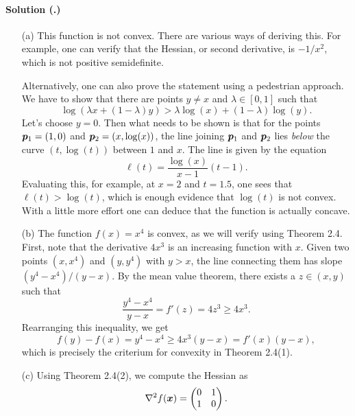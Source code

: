 \documentclass{article}
\newcounter{problemSheetNumber}
\newcounter{problems}
\renewcommand{\solution}[1]{\paragraph{Solution (\theproblemSheetNumber.\theproblems)}\addtocounter{problems}{1}\label{#1}}
\begin{document}
\solution{pr:2}
\begin{itemize}
 \item[(a)] This function is not convex. There are various ways of deriving this. For example, one can verify that the Hessian, or second derivative, is $-1/x^2$, which is not positive semidefinite. 
 
 Alternatively, one can also prove the statement using a pedestrian approach. We have to show that there are points $y\neq x$ and $\lambda \in [0,1]$ such that
 \begin{equation*}
  \log(\lambda x+(1-\lambda)y) > \lambda \log(x)+(1-\lambda)\log(y).
 \end{equation*}
 Let's choose $y=0$. Then what needs to be shown is that for the points $\bm{p}_1=(1,0)$ and $\bm{p}_2=(x,\log(x))$,
 the line joining $\bm{p}_1$ and $\bm{p}_2$ lies {\em below} the curve $(t,\log(t))$ between $1$ and $x$. The line is given by the equation
 \begin{equation*}
  \ell(t) = \frac{\log(x)}{x-1}(t-1).
 \end{equation*}
 Evaluating this, for example, at $x=2$ and $t=1.5$, one sees that $\ell(t)>\log(t)$, which is enough evidence that $\log(t)$ is not convex.
 With a little more effort one can deduce that the function is actually concave.
\item[(b)] The function $f(x)=x^4$ is convex, as we will verify using Theorem 2.4. First, note that the derivative $4x^3$ is an increasing function with $x$. 
Given two points $(x,x^4)$ and $(y,y^4)$ with $y>x$, the line connecting them has slope $(y^4-x^4)/(y-x)$. By the mean value theorem, there exists a $z\in (x,y)$ such that
\begin{equation*}
 \frac{y^4-x^4}{y-x} = f'(z) = 4z^3 \geq 4x^3.
\end{equation*}
Rearranging this inequality, we get
\begin{equation*}
 f(y)-f(x) = y^4-x^4 \geq 4x^3(y-x) = f'(x)(y-x),
\end{equation*}
which is precisely the criterium for convexity in Theorem 2.4(1).
\item[(c)] Using Theorem 2.4(2), we compute the Hessian as
\begin{equation*}
 \nabla^2f(\bm{x}) = \begin{pmatrix}
                       0 & 1\\
                       1 & 0
                      \end{pmatrix}.
\end{equation*}

\end{itemize}
\end{document}
